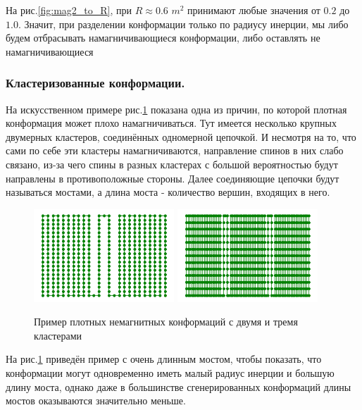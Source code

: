 На рис.\ref{fig:mag2_to_R}, при $R \approx 0.6$ $m^2$ принимают любые значения от $0.2$ до $1.0$. Значит, при разделении конформации только по радиусу инерции, мы либо будем отбрасывать намагничивающиеся конформации, либо оставлять не намагничивающиеся

\subsubsection*{Кластеризованные конформации.} \label{par:clusterized_conformations}


На искусственном примере рис.\ref{fig:synth_cluster_conf} показана одна из причин, по которой плотная конформация может плохо намагничиваться. Тут имеется несколько крупных двумерных кластеров, соединённых одномерной цепочкой. И несмотря на то, что сами по себе эти кластеры намагничиваются, направление спинов в них слабо связано, из-за чего спины в разных кластерах с большой вероятностью будут направлены в противоположные стороны. Далее соединяющие цепочки будут называться мостами, а длина моста - количество вершин, входящих в него.

\begin{figure}[ht]
	\centering
	\includegraphics[width=0.47\textwidth]{../images/2Cluster_conformation.png}
	\includegraphics[width=0.47\textwidth]{../images/3Cluster_conformation.png} 
	\caption{Пример плотных немагнитных конформаций с двумя и тремя кластерами}
	\label{fig:synth_cluster_conf}
\end{figure}

На рис.\ref{fig:synth_cluster_conf} приведён пример с очень длинным мостом, чтобы показать, что конформации могут одновременно иметь малый радиус инерции и большую длину моста, однако даже в большинстве сгенерированных конформаций длины мостов оказываются значительно меньше.

